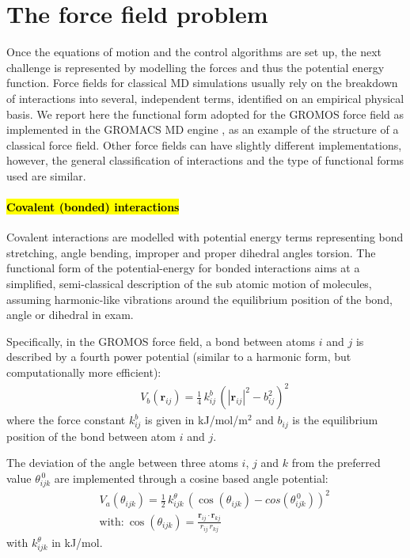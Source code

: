 \section{The force field problem} \label{sec:ff}

Once the equations of motion and the control algorithms are set up, the next challenge is represented by modelling the forces and thus the potential energy function.
%
Force fields for classical MD simulations usually rely on the breakdown of interactions into several, independent terms, identified on an empirical physical basis. We report here the functional form adopted for the GROMOS force field \cite{Oostenbrink2004,Schmid2011} as implemented in the GROMACS MD engine \cite{Berendsen1995,Abraham2015,gromacs_man}, as an example of the structure of a classical force field.
%
Other force fields can have slightly different implementations, however, the general classification of interactions and the type of functional forms used are similar.

\paragraph{\hl{Covalent (bonded) interactions}} Covalent interactions are modelled with potential energy terms representing bond stretching, angle bending, improper and proper dihedral angles torsion.
%
The functional form of the potential-energy for bonded interactions aims at a simplified, semi-classical description of the sub atomic motion of molecules, assuming harmonic-like vibrations around the equilibrium position of the bond, angle or dihedral in exam.

Specifically, in the GROMOS force field, a bond between atoms $i$ and $j$ is described by a fourth power potential (similar to a harmonic form, but computationally more efficient):
\begin{eqnarray}
&& V_b(\textbf{r}_{ij}) = \frac{1}{4}\,k^b_{ij}\,\left(|\textbf{r}_{ij}|^2 - b_{ij}^2\right)^2
\end{eqnarray}
where the force constant $k^b_{ij}$ is given in kJ/mol/m$^2$ and $b_{ij}$ is the equilibrium position of the bond between atom $i$ and $j$.

The deviation of the angle between three atoms $i$, $j$ and $k$ from the preferred value $\theta^{\, 0}_{ijk}$ are implemented through a cosine based angle potential:
\begin{eqnarray}
&& V_a(\theta_{ijk}) = \frac{1}{2}\,k^\theta_{ijk}\,\left(\cos\left(\theta_{ijk}\right) - cos\left(\theta^{\, 0}_{ijk}\right)\right)^2 \\
&& \text{with:} \ \cos\left(\theta_{ijk}\right) = \frac{\textbf{r}_{ij}\cdot \textbf{r}_{kj}}{r_{ij}\,r_{kj}}
\end{eqnarray}
with $k^\theta_{ijk}$ in kJ/mol.

